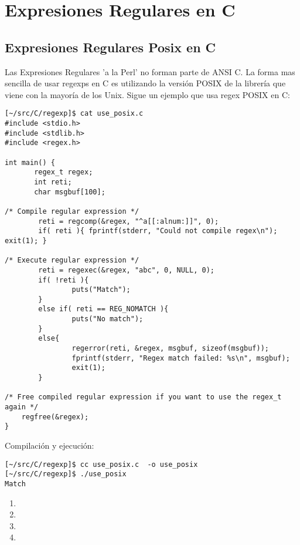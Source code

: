 \chapter{Expresiones Regulares en C} 

\section{Expresiones Regulares Posix en C}
Las Expresiones Regulares 'a la Perl' no forman parte de ANSI C. 
La forma mas sencilla de usar regexps en C es utilizando la versión POSIX de la
librería que viene con la mayoría de los Unix.
Sigue un ejemplo que usa regex POSIX en C:
\begin{verbatim}
[~/src/C/regexp]$ cat use_posix.c 
#include <stdio.h>
#include <stdlib.h>
#include <regex.h>        

int main() {
       regex_t regex;
       int reti;
       char msgbuf[100];

/* Compile regular expression */
        reti = regcomp(&regex, "^a[[:alnum:]]", 0);
        if( reti ){ fprintf(stderr, "Could not compile regex\n"); exit(1); }

/* Execute regular expression */
        reti = regexec(&regex, "abc", 0, NULL, 0);
        if( !reti ){
                puts("Match");
        }
        else if( reti == REG_NOMATCH ){
                puts("No match");
        }
        else{
                regerror(reti, &regex, msgbuf, sizeof(msgbuf));
                fprintf(stderr, "Regex match failed: %s\n", msgbuf);
                exit(1);
        }

/* Free compiled regular expression if you want to use the regex_t again */
    regfree(&regex);
}
\end{verbatim}
Compilación y ejecución:
\begin{verbatim}
[~/src/C/regexp]$ cc use_posix.c  -o use_posix
[~/src/C/regexp]$ ./use_posix 
Match
\end{verbatim}


\begin{enumerate}
\item 
{}
\item 
{}
\item 
{}
\item 
{}
\end{enumerate}

